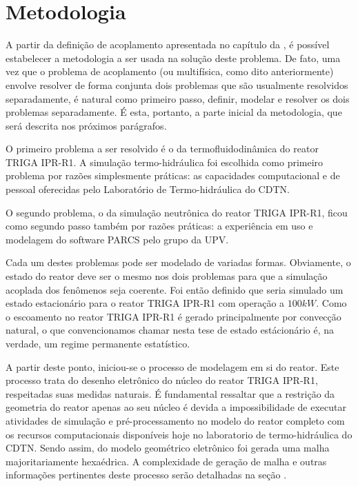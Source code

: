 \documentclass[12pt,openright,twoside,a4paper,english,french,spanish,brazil]{abntex2}
\begin{document}
\chapter*[Metodologia]{Metodologia}
\label{chap:metodologia}

A partir da definição de acoplamento apresentada no capítulo da , é possível estabelecer a 
metodologia a ser usada na solução deste problema. De fato, uma vez que o problema de acoplamento 
(ou multifísica, como dito anteriormente) envolve resolver de forma conjunta dois problemas que 
são usualmente resolvidos separadamente, é natural como primeiro passo, definir, modelar e resolver 
os dois problemas separadamente. É esta, portanto, a parte inicial da metodologia, que será descrita nos próximos 
parágrafos.

O primeiro problema a ser resolvido é o da termofluidodinâmica do reator TRIGA IPR-R1. A simulação 
termo-hidráulica foi escolhida como primeiro problema por razões simplesmente práticas: as capacidades 
computacional e de pessoal oferecidas pelo Laboratório de Termo-hidráulica do CDTN. 

O segundo problema, o da simulação neutrônica do reator TRIGA IPR-R1, ficou como segundo passo também 
por razões práticas: a experiência em uso e modelagem do software PARCS pelo grupo da UPV.

Cada um destes problemas pode ser modelado de variadas formas. Obviamente, o estado do reator deve ser 
o mesmo nos dois problemas para que a simulação acoplada dos fenômenos seja coerente. Foi então definido 
que seria simulado um estado estacionário para o reator TRIGA IPR-R1 com operação a $100 kW$. Como o escoamento 
no reator TRIGA IPR-R1 é gerado principalmente por convecção natural, o que convencionamos chamar nesta tese de 
estado estácionário é, na verdade, um regime permanente estatístico. %

A partir deste ponto, iniciou-se o processo de modelagem em si do reator. Este processo trata do desenho 
eletrônico do núcleo do reator TRIGA IPR-R1, respeitadas suas medidas naturais. É fundamental ressaltar 
que a restrição da geometria do reator apenas ao seu núcleo é devida a impossibilidade de executar 
atividades de simulação e pré-processamento no modelo do reator completo com os recursos 
computacionais disponíveis hoje no laboratorio de termo-hidráulica do CDTN. Sendo assim, do modelo 
geométrico eletrônico foi gerada uma malha majoritariamente hexaédrica. A complexidade de geração de 
malha e outras informações pertinentes deste processo serão detalhadas na seção .
\end{document}
